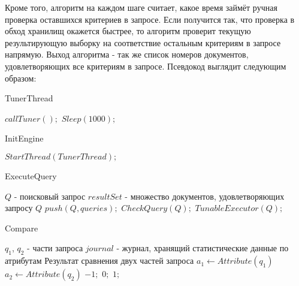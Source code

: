 \documentclass{matmex-diploma}
\begin{document}
        Кроме того, алгоритм на каждом шаге считает, какое время займёт ручная проверка оставшихся критериев в запросе. Если получится так, что проверка в обход хранилищ окажется быстрее, то алгоритм проверит текущую результирующую выборку на соответствие остальным критериям в запросе напрямую. Выход алгоритма - так же список номеров документов, удовлетворяющих все критериям в запросе. Псевдокод выглядит следующим образом:
        
        \begin{algorithm}[H]
        \caption{TunerThread}
        \label{tunerThread}
            \begin{algorithmic}
                    \STATE $callTuner();$
                    \STATE $Sleep(1000);$
                \ENDWHILE
            \end{algorithmic}
        \end{algorithm}
        
        \begin{algorithm}[H]
        \caption{InitEngine}
        \label{init}
            \begin{algorithmic}
                \STATE $StartThread(TunerThread);$
            \end{algorithmic}
        \end{algorithm}
        
        \begin{algorithm}[H]
        \caption{ExecuteQuery}
        \label{exec}
            \begin{algorithmic}
                \REQUIRE $Q$ - поисковый запрос
                \ENSURE $resultSet$ - множество документов, удовлетворяющих запросу $Q$
                \STATE $push(Q, queries);$
                \STATE $CheckQuery(Q);$  
                \RETURN $TunableExecutor(Q);$
            \end{algorithmic}
        \end{algorithm}
        
        \begin{algorithm}[H]                   
        \caption{Compare}              
        \label{cmp1}                        
            \begin{algorithmic}        
                \REQUIRE $q_1$, $q_2$ - части запроса $journal$ - журнал, хранящий статистические данные по атрибутам
                \ENSURE Результат сравнения двух частей запроса
                \STATE $a_1 \leftarrow Attribute(q_1)$
                \STATE $a_2 \leftarrow Attribute(q_2)$
                    \RETURN $-1;$
                \ELSE 
                        \RETURN $0;$
                    \ELSE
                        \RETURN $1;$
                    \ENDIF
                \ENDIF
            \end{algorithmic}
        \end{algorithm}
        
\end{document}
